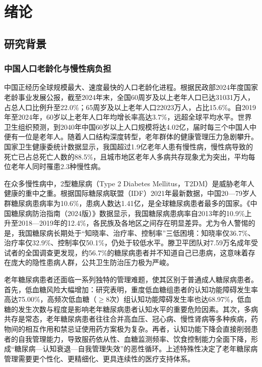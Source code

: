 \chapter{绪论}

\section{研究背景}

\subsection{中国人口老龄化与慢性病负担}

中国正经历全球规模最大、速度最快的人口老龄化进程。根据民政部2024年度国家老龄事业发展公报，截至2024年末，全国60周岁及以上老年人口已达31031万人，占总人口比例升至22.0\%；65周岁及以上老年人口22023万人，占比15.6\%。自2019年至2024年，60岁以上老年人口年均增长率高达3.7\%，远超全球平均水平。世界卫生组织预测，到2040年中国60岁以上人口规模将达4.02亿，届时每三个中国人中便有一位是老年人。随着人口结构深度转型，老年群体的健康管理压力急剧攀升。国家卫生健康委统计数据显示，我国超过1.9亿老年人患有慢性病，慢性病导致的死亡已占总死亡人数的88.5\%，且城市地区老年人多病共存现象尤为突出，平均每位老年人同时罹患2.3种慢性病\todocite{}\todocite{}\todocite{}。

在众多慢性病中，2型糖尿病（Type 2 Diabetes Mellitus，T2DM）是威胁老年人健康的重中之重。根据国际糖尿病联盟（IDF）2021年最新数据，中国20---79岁人群糖尿病患病率为10.6\%，患病人数达1.41亿，是全球糖尿病患者最多的国家。《中国糖尿病防治指南（2024版）》数据显示，我国糖尿病患病率自2013年的10.9\%上升至2018---2019年的12.4\%，各民族及各地区之间存在明显差异。尤为令人警惕的是，我国糖尿病长期处于``知晓率、治疗率、控制率''三低困境：知晓率仅36.7\%、治疗率仅32.9\%、控制率仅50.1\%，仍处于较低水平。滕卫平团队对7.59万名成年受试者的全国调查更发现，约56.7\%的糖尿病患者并不知道自己已患病，这意味着存在庞大的隐性患病人群，公共卫生防治压力极为严峻\todocite{}\todocite{}。

老年糖尿病患者还面临一系列独特的管理难题，使其区别于普通成人糖尿病患者。首先，低血糖风险大幅增加：研究表明，重度低血糖组患者的认知功能障碍发生率高达75.00\%，高频次低血糖（$\geq$8次）组认知功能障碍发生率也达68.97\%，低血糖的发生次数与程度是影响老年糖尿病患者认知水平的重要危险因素。其次，多病共存是常态，老年糖尿病患者往往合并高血压、冠心病、慢性肾病等多种疾病，药物间的相互作用和禁忌证使用药方案极为复杂。再者，认知功能下降会直接削弱患者的自我管理能力，导致服药依从性、血糖监测频率、饮食控制能力全面下降，形成``糖尿病---认知衰退---自我管理失效''的恶性循环。上述特殊性决定了老年糖尿病管理需要更个性化、更精细化、更具连续性的医疗支持体系\todocite{}\todocite{}\todocite{}。

